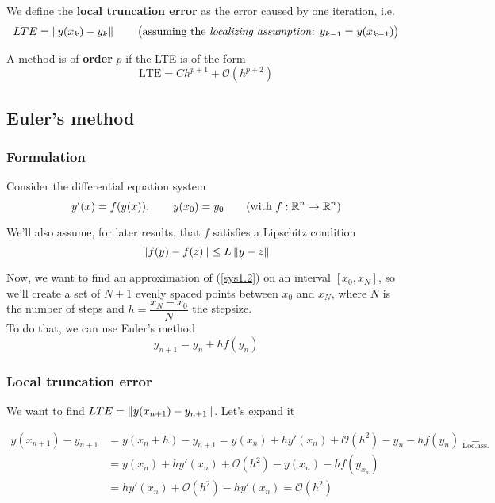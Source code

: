 \begin{definition}
  We define the \textbf{local truncation error} as the error caused by one iteration, i.e. $$LTE = \left\lVert y(x_k) - y_k\right\rVert \qquad \text{\big(assuming the \textit{localizing assumption}: $y_{k-1} = y(x_{k-1})$\big)}$$
\end{definition}

\begin{definition}
  A method is of \textbf{order} $p$ if the LTE is of the form $$\text{LTE} = Ch^{p+1} + \mathcal{O}(h^{p+2})$$
\end{definition}

\subsection{Euler's method}
\subsubsection{Formulation}
Consider the differential equation system
\begin{equation}\label{sys1.2}
  y'(x) = f(y(x)), \qquad y(x_0) = y_0 \qquad (\text{with } f:\mathbb{R}^n \to \mathbb{R}^n)
\end{equation}

We'll also assume, for later results, that $f$ satisfies a Lipschitz condition $$\left\lVert f(y) - f(z)\right\rVert \leq L\left\lVert y-z\right\rVert$$

Now, we want to find an approximation of (\ref{sys1.2}) on an interval $[x_0, x_N]$, so we'll create a set of $N+1$ evenly spaced points between $x_0$ and $x_N$, where $N$ is the number of steps and $h = \dfrac{x_N-x_0}{N}$ the stepsize.\\

To do that, we can use Euler's method
\[
  y_{n+1} = y_n + hf(y_n)
\]

\newpage

\subsubsection{Local truncation error}

We want to find $LTE = \left\lVert y(x_{n+1}) - y_{n+1}\right\rVert$. Let's expand it

\begin{align*}
    y(x_{n+1}) - y_{n+1} &= y(x_n + h) - y_{n+1} = y(x_n) + hy'(x_n) + \mathcal{O}(h^2) - y_n - hf(y_n) \underset{\text{Loc.ass.}}{=} \\
    &= y(x_n)+ hy'(x_n) + \mathcal{O}(h^2) - y(x_n) - hf(y_{x_n}) \\
    &= hy'(x_n) + \mathcal{O}(h^2) - hy'(x_n) = \mathcal{O}(h^2)
\end{align*}
  
